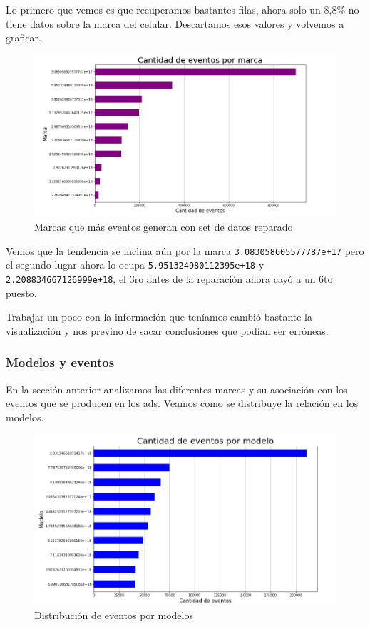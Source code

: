 \documentclass[a4paper, 12pt]{article}
\begin{document}
		Lo primero que vemos es que recuperamos bastantes filas, ahora solo un 8,8\% no tiene datos sobre la marca del celular.
		Descartamos esos valores y volvemos a graficar.

		\FloatBarrier
        		\begin{figure}[h]
        			\centering
        			\includegraphics[width=\textwidth]{images/events/event_per_brand_fixed.png}
        			\caption{Marcas que más eventos generan con set de datos reparado}
        		\end{figure}
        \FloatBarrier

        Vemos que la tendencia se inclina aún por la marca \texttt{3.083058605577787e+17} pero el segundo lugar ahora lo ocupa
        \texttt{5.951324980112395e+18} y \texttt{2.208834667126999e+18}, el 3ro antes de la reparación ahora cayó a un 6to puesto.

        Trabajar un poco con la información que teníamos cambió bastante la visualización y nos previno de sacar conclusiones
        que podían ser erróneas.


	\subsubsection{Modelos y eventos}
	En la sección anterior analizamos las diferentes marcas y su asociación con los eventos que se producen en los ads. Veamos como se distribuye
	la relación en los modelos.

	\FloatBarrier
    		\begin{figure}[h]
    			\centering
    			\includegraphics[width=\textwidth]{images/events/eventsbymodel.png}
    			\caption{Distribución de eventos por modelos}
    		\end{figure}
    		\FloatBarrier
\end{document}
